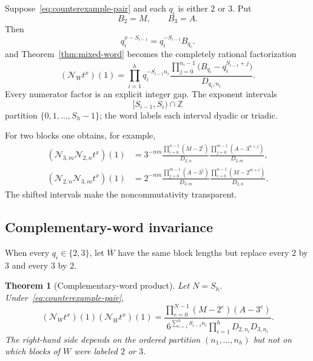 \documentclass[11pt,oneside]{article}
\newtheorem{theorem}{Theorem}[section]
\theoremstyle{definition}
\theoremstyle{remark}
\newcommand{\Z}{\mathbb Z}
\begin{document}
Suppose~\eqref{eq:counterexample-pair} and each $q_i$ is either $2$ or $3$.  Put
\[
 B_2=M,
 \qquad
 B_3=A.
\]
Then
\begin{equation}
 q_i^{x-S_{i-1}}=q_i^{-S_{i-1}}B_{q_i}.
\end{equation}
and Theorem~\ref{thm:mixed-word} becomes the completely rational factorization
\begin{equation}
 (\mathcal N_W t^x)(1)
 =\prod_{i=1}^h
 q_i^{-S_{i-1}n_i}
 \frac{\displaystyle\prod_{j=0}^{n_i-1}
       \bigl(B_{q_i}-q_i^{S_{i-1}+j}\bigr)}
      {D_{q_i,n_i}}.
 \label{eq:counterexample-word-factorization}
\end{equation}
Every numerator factor is an explicit integer gap.  The exponent intervals
\[
 [S_{i-1},S_i)\cap\Z
\]
partition $\{0,1,\ldots,S_h-1\}$; the word labels each interval dyadic or triadic.

For two blocks one obtains, for example,
\begin{align}
 (\mathcal N_{3,m}\mathcal N_{2,n}t^x)(1)
 &=3^{-nm}
   \frac{\prod_{i=0}^{n-1}(M-2^i)}{D_{2,n}}
   \frac{\prod_{j=0}^{m-1}(A-3^{n+j})}{D_{3,m}},
 \label{eq:two-block-23}\\
 (\mathcal N_{2,n}\mathcal N_{3,m}t^x)(1)
 &=2^{-nm}
   \frac{\prod_{j=0}^{m-1}(A-3^j)}{D_{3,m}}
   \frac{\prod_{i=0}^{n-1}(M-2^{m+i})}{D_{2,n}}.
 \label{eq:two-block-32}
\end{align}
The shifted intervals make the noncommutativity transparent.

\subsection{Complementary-word invariance}

When every $q_i\in\{2,3\}$, let $\overline W$ have the same block lengths but replace every
$2$ by $3$ and every $3$ by $2$.

\begin{theorem}[Complementary-word product]
\label{thm:complementary-word}
Let $N=S_h$.  Under~\eqref{eq:counterexample-pair},
\begin{equation}
 (\mathcal N_Wt^x)(1)(\mathcal N_{\overline W}t^x)(1)
 =
 \frac{\displaystyle\prod_{e=0}^{N-1}(M-2^e)(A-3^e)}
 {\displaystyle
  6^{\sum_{i=1}^h S_{i-1}n_i}
  \prod_{i=1}^h D_{2,n_i}D_{3,n_i}}.
 \label{eq:complementary-product}
\end{equation}
The right-hand side depends on the ordered partition $(n_1,\ldots,n_h)$ but not on which
blocks of $W$ were labeled $2$ or $3$.
\end{theorem}
\end{document}
